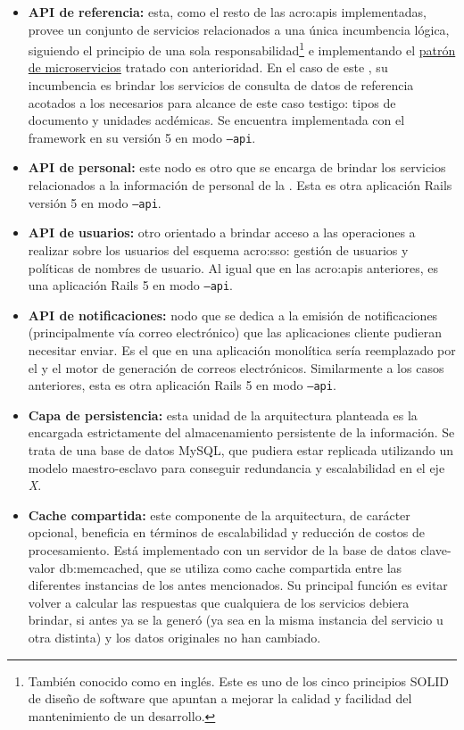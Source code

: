 \begin{itemize}
  \item \textbf{API de referencia:} esta, como el resto de las \glspl{acro:api} implementadas, provee un conjunto de servicios relacionados a una única incumbencia lógica, siguiendo el principio de una sola responsabilidad\footnote{También conocido como  en inglés. Este es uno de los cinco principios SOLID de diseño de software que apuntan a mejorar la calidad y facilidad del mantenimiento de un desarrollo.} e implementando el \hyperref[microservicios]{patrón de microservicios} tratado con anterioridad. En el caso de este , su incumbencia es brindar los servicios de consulta de datos de referencia acotados a los necesarios para alcance de este caso testigo: tipos de documento y unidades acdémicas. Se encuentra implementada con el framework  en su versión 5 en modo \texttt{--api}.

  \item \textbf{API de personal:} este nodo es otro  que se encarga de brindar los servicios relacionados a la información de personal de la {\unlp}. Esta es otra aplicación Rails versión 5 en modo \texttt{--api}.

  \item \textbf{API de usuarios:} otro  orientado a brindar acceso a las operaciones a realizar sobre los usuarios del esquema \gls{acro:sso}: gestión de usuarios y políticas de nombres de usuario. Al igual que en las \glspl{acro:api} anteriores, es una aplicación Rails 5 en modo \texttt{--api}.

  \item \textbf{API de notificaciones:} nodo que se dedica a la emisión de notificaciones (principalmente vía correo electrónico) que las aplicaciones cliente pudieran necesitar enviar. Es el  que en una aplicación monolítica sería reemplazado por el  y el motor de generación de correos electrónicos. Similarmente a los casos anteriores, esta es otra aplicación Rails 5 en modo \texttt{--api}.

  \item \textbf{Capa de persistencia:} esta unidad de la arquitectura planteada es la encargada estrictamente del almacenamiento persistente de la información. Se trata de una base de datos MySQL, que pudiera estar replicada utilizando un modelo maestro-esclavo para conseguir redundancia y escalabilidad en el eje \textit{X}.

  \item \textbf{Cache compartida:} este componente de la arquitectura, de carácter opcional, beneficia en términos de escalabilidad y reducción de costos de procesamiento. Está implementado con un servidor de la base de datos clave-valor \gls{db:memcached}, que se utiliza como cache compartida entre las diferentes instancias de los  antes mencionados. Su principal función es evitar volver a calcular las respuestas que cualquiera de los servicios debiera brindar, si antes ya se la generó (ya sea en la misma instancia del servicio u otra distinta) y los datos originales no han cambiado.
\end{itemize}

